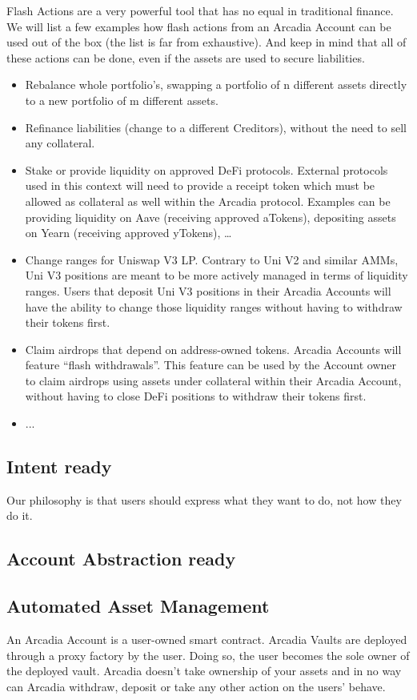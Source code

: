\documentclass[sigconf,nonacm]{acmart}
\begin{document}
Flash Actions are a very powerful tool that has no equal in traditional finance.
We will list a few examples how flash actions from an Arcadia Account can be used out of the box (the list is far from exhaustive).
And keep in mind that all of these actions can be done, even if the assets are used to secure liabilities.

\begin{itemize}
    \item Rebalance whole portfolio's, swapping a portfolio of n different assets directly to a new portfolio of m different assets.
    \item Refinance liabilities (change to a different Creditors), without the need to sell any collateral.
    \item Stake or provide liquidity on approved DeFi protocols.
    External protocols used in this context will need to provide a receipt token which must be allowed as collateral as well within the Arcadia protocol.
    Examples can be providing liquidity on Aave (receiving approved aTokens), depositing assets on Yearn (receiving approved yTokens), …
    \item Change ranges for Uniswap V3 LP. Contrary to Uni V2 and similar AMMs, Uni V3 positions are meant to be more actively managed in terms of liquidity ranges.
    Users that deposit Uni V3 positions in their Arcadia Accounts will have the ability to change those liquidity ranges without having to withdraw their tokens first.
    \item Claim airdrops that depend on address-owned tokens. Arcadia Accounts will feature “flash withdrawals”.
    This feature can be used by the Account owner to claim airdrops using assets under collateral within their Arcadia Account, without having to close DeFi positions to withdraw their tokens first.
    \item ...
\end{itemize}

\subsection{Intent ready}
Our philosophy is that users should express what they want to do, not how they do it.

\subsection{Account Abstraction ready}

\subsection{Automated Asset Management}
An Arcadia Account is a user-owned smart contract.
Arcadia Vaults are deployed through a proxy factory by the user.
Doing so, the user becomes the sole owner of the deployed vault.
Arcadia doesn’t take ownership of your assets and in no way can Arcadia withdraw, deposit or take any other action on the users’ behave.
\end{document}
